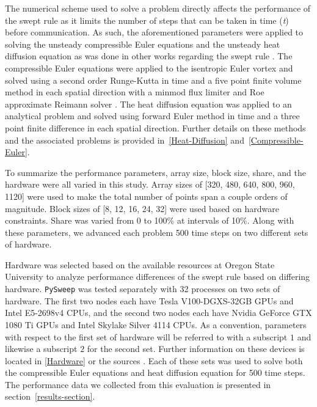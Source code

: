 \documentclass[journal,article,submit,moreauthors,pdftex]{Definitions/mdpi}
\def\pysweep{\texttt{PySweep}}
\def\oldCPU{Intel Skylake Silver 4114} %
\def\oldGPU{Nvidia GeForce GTX 1080 Ti}
\def\newCPU{Intel E5-2698v4} %
\def\newGPU{Tesla V100-DGXS-32GB}
\begin{document}
\par
The numerical scheme used to solve a problem directly affects the performance of the swept rule as it limits the number of steps that can be taken in time (\textit{t}) before communication. As such, the aforementioned parameters were applied to solving the unsteady compressible Euler equations and the unsteady heat diffusion equation as was done in other works regarding the swept rule \cite{Alhubail2016ThePDEs,Alhubail2018ThePDEs,Magee2018AcceleratingDecomposition, Magee2020ApplyingSystems}. The compressible Euler equations were applied to the isentropic Euler vortex and solved using a second order Runge-Kutta in time and a five point finite volume method in each spatial direction with a minmod flux limiter and Roe approximate Reimann solver \cite{SpiegelAMethods,Leveque2002FiniteProblems}. The heat diffusion equation was applied to an analytical problem and solved using forward Euler method in time and a three point finite difference in each spatial direction. Further details on these methods and the associated problems is provided in~\ref{Heat-Diffusion} and~\ref{Compressible-Euler}.

\par
To summarize the performance parameters, array size, block size, share, and the hardware were all varied in this study. Array sizes of [320, 480, 640, 800, 960, 1120] were used to make the total number of points span a couple orders of magnitude. Block sizes of [8, 12, 16, 24, 32] were used based on hardware constraints. Share was varied from 0 to 100\% at intervals of 10\%. Along with these parameters, we advanced each problem 500 time steps on two different sets of hardware.

\par
Hardware was selected based on the available resources at Oregon State University to analyze performance differences of the swept rule based on differing hardware. \pysweep{} was tested separately with 32 processes on two sets of hardware. The first two nodes each have \newGPU{} GPUs and \newCPU{} CPUs, and the second two nodes each have \oldGPU{} GPUs and \oldCPU{} CPUs. As a convention, parameters with respect to the first set of hardware will be referred to with a subscript $1$ and likewise a subscript $2$ for the second set. Further information on these devices is located in \ref{Hardware} or the sources \cite{Intel123550,Intel91753,GeForceGeForce,NVIDIANVIDIA}. Each of these sets was used to solve both the compressible Euler equations and heat diffusion equation for 500 time steps. The performance data we collected from this evaluation is presented in section~\ref{results-section}. 
\end{document}
